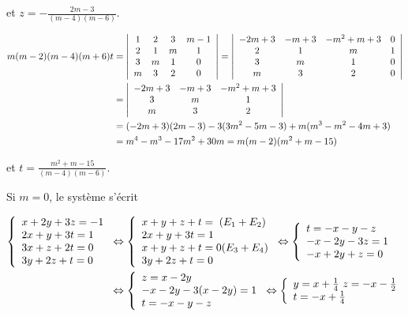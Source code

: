 {\begin{enumerate}
{et $z=-\frac{2m-3}{(m-4)(m-6)}$.

\begin{align*}\ensuremath
m(m-2)(m-4)(m+6)t&=\left|
\begin{array}{cccc}
1&2&3&m-1\\
2&1&m&1\\
3&m&1&0\\
m&3&2&0
\end{array}\right|=\left|
\begin{array}{cccc}
-2m+3&-m+3&-m^2+m+3&0\\
2&1&m&1\\
3&m&1&0\\
m&3&2&0
\end{array}\right|\\
 &=\left|
\begin{array}{ccc}
-2m+3&-m+3&-m^2+m+3\\
3&m&1\\
m&3&2
\end{array}\right|\\
 &=(-2m+3)(2m-3)-3(3m^2-5m-3)+m(m^3-m^2-4m+3)\\
 &=m^4-m^3-17m^2+30m=m(m-2)(m^2+m-15)
\end{align*}

et $t=\frac{m^2+m-15}{(m-4)(m-6)}$.

Si $m = 0$, le système s'écrit 

\begin{align*}\ensuremath
\left\{
\begin{array}{l}
x+2y+3z=-1\\
2x+y+3t=1\\
3x+z+2t=0\\
3y+2z+t=0
\end{array}
\right.&\Leftrightarrow\left\{
\begin{array}{l}
x+y+z+t=\;(E_1+E_2)\\
2x+y+3t=1\\
x+y+z+t=0(E_3+E_4)\\
3y+2z+t=0
\end{array}
\right.\Leftrightarrow\left\{
\begin{array}{l}
t=-x-y-z\\
-x-2y-3z=1\\
-x+2y+z=0
\end{array}
\right.
\\
 &\Leftrightarrow\left\{
\begin{array}{l}
z=x-2y\\
-x-2y-3(x-2y)=1\\
t=-x-y-z
\end{array}
\right.\Leftrightarrow\left\{
\begin{array}{l}
y=x+\frac{1}{4}\
z=-x-\frac{1}{2}\\
t=-x+\frac{1}{4}
\end{array}
\right.
\end{align*}

}
\end{enumerate}}
